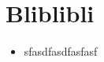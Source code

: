 %			
%			 
%				
%
%	
%
%
%
%	
%	
%	
%	
%	
%	




\section{Bliblibli}\label{sect.anhang.ah}



\begin{itemize}
	\item sfasdfasdfasfasf
\end{itemize}
\newpage
